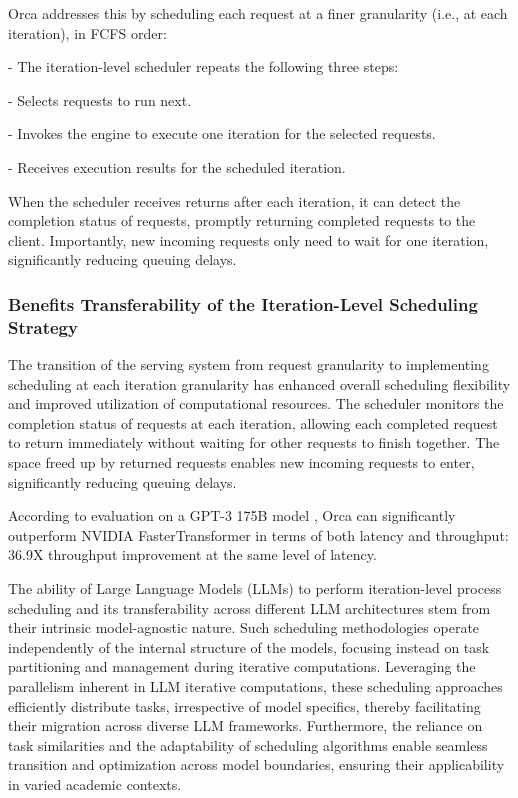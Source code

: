 \documentclass[conference]{IEEEtran}
\begin{document}
Orca addresses this by scheduling each request at a finer granularity (i.e., at each iteration), in FCFS order:

- The iteration-level scheduler repeats the following three steps:

- Selects requests to run next.

- Invokes the engine to execute one iteration for the selected requests.

- Receives execution results for the scheduled iteration.

When the scheduler receives returns after each iteration, it can detect the completion status of requests, promptly returning completed requests to the client. Importantly, new incoming requests only need to wait for one iteration, significantly reducing queuing delays.

\subsubsection{Benefits Transferability of the Iteration-Level Scheduling Strategy}


The transition of the serving system from request granularity to implementing scheduling at each iteration granularity has enhanced overall scheduling flexibility and improved utilization of computational resources.
The scheduler monitors the completion status of requests at each iteration, allowing each completed request to return immediately without waiting for other requests to finish together. The space freed up by returned requests enables new incoming requests to enter, significantly reducing queuing delays.

According to evaluation on a GPT-3 175B model , Orca can significantly outperform NVIDIA FasterTransformer in terms of both latency and throughput: 36.9X throughput improvement at the same level of latency. \cite{b10}


The ability of Large Language Models (LLMs) to perform iteration-level process scheduling and its transferability across different LLM architectures stem from their intrinsic model-agnostic nature. Such scheduling methodologies operate independently of the internal structure of the models, focusing instead on task partitioning and management during iterative computations. Leveraging the parallelism inherent in LLM iterative computations, these scheduling approaches efficiently distribute tasks, irrespective of model specifics, thereby facilitating their migration across diverse LLM frameworks. Furthermore, the reliance on task similarities and the adaptability of scheduling algorithms enable seamless transition and optimization across model boundaries, ensuring their applicability in varied academic contexts.
\end{document}
